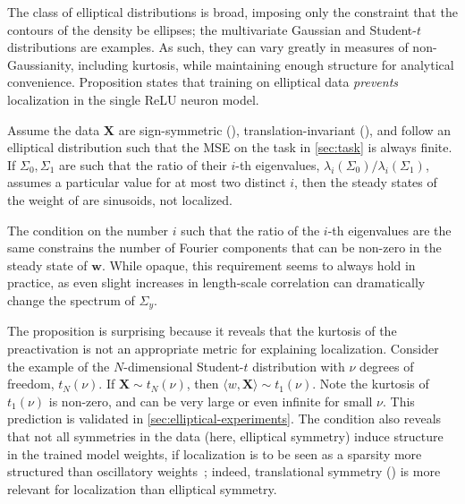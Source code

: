 The class of elliptical distributions is broad, imposing only the constraint that the contours of the density be ellipses;
the multivariate Gaussian and Student-$t$ distributions are examples. %
As such, they can vary greatly in measures of non-Gaussianity, including kurtosis, while maintaining enough structure for analytical convenience.
Proposition  states that training on elliptical data \emph{prevents} localization in the single ReLU neuron model.
\begin{proposition} \label{thm:elliptical}
  Assume the data $\mathbf{X}$ are 
  sign-symmetric (),
  translation-invariant (), 
  and follow an elliptical distribution such that the MSE on the task in \cref{sec:task} is always finite.
    If $\Sigma_0, \Sigma_1$ are such that the ratio of their $i$-th eigenvalues, $\lambda_i(\Sigma_0) / \lambda_i(\Sigma_1)$, assumes a particular value for at most two distinct $i$, then the steady states of the weight of  are sinusoids, \ie not localized.
\end{proposition}

The condition on the number $i$ such that the ratio of the $i$-th eigenvalues are the same constrains the number of Fourier components that can be non-zero in the steady state of $\mathbf{w}$.
While opaque, this requirement seems to always hold in practice, as even slight increases in length-scale correlation can dramatically change the spectrum of $\Sigma_y$.

The proposition is surprising because it reveals that the kurtosis of the preactivation is not an appropriate metric for explaining localization.
Consider the example of the $N$-dimensional Student-$t$ distribution with $\nu$ degrees of freedom, $t_N(\nu)$.
If $\mathbf{X} \sim t_N(\nu)$, then $\langle w, \mathbf{X} \rangle \sim t_1(\nu)$.
Note the kurtosis of $t_1(\nu)$ is non-zero, and can be very large or even infinite for small $\nu$.
This prediction is validated in \cref{sec:elliptical-experiments}.
The condition also reveals that not all symmetries in the data (here, elliptical symmetry) induce structure in the trained model weights, if localization is to be seen as a sparsity more structured than oscillatory weights~\parencite[\cf][]{godfrey2023symmetries}; indeed, translational symmetry () is more relevant for localization than elliptical symmetry.

